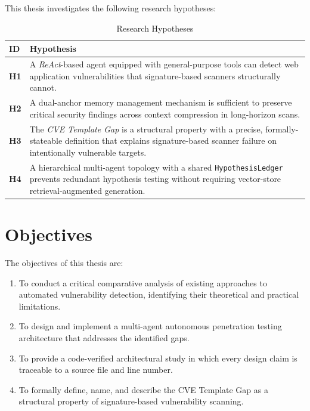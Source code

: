 \documentclass[12pt, a4paper, oneside, openany]{book}
\newcommand{\code}[1]{\texttt{#1}}
\begin{document}
This thesis investigates the following research hypotheses:

\begin{table}[H]
\centering
\caption{Research Hypotheses}
\label{tab:hypotheses}
\begin{tabularx}{\textwidth}{@{}l X@{}}
\toprule
\textbf{ID} & \textbf{Hypothesis} \\
\midrule
\textbf{H1} & A \textit{ReAct}-based agent equipped with general-purpose tools can detect web application vulnerabilities that signature-based scanners structurally cannot. \\
\textbf{H2} & A dual-anchor memory management mechanism is sufficient to preserve critical security findings across context compression in long-horizon scans. \\
\textbf{H3} & The \textit{CVE Template Gap} is a structural property with a precise, formally-stateable definition that explains signature-based scanner failure on intentionally vulnerable targets. \\
\textbf{H4} & A hierarchical multi-agent topology with a shared \code{HypothesisLedger} prevents redundant hypothesis testing without requiring vector-store retrieval-augmented generation. \\
\bottomrule
\end{tabularx}
\end{table}

\section*{Objectives}

The objectives of this thesis are:
\begin{enumerate}[leftmargin=*]
  \item To conduct a critical comparative analysis of existing approaches to automated vulnerability detection, identifying their theoretical and practical limitations.
  \item To design and implement a multi-agent autonomous penetration testing architecture that addresses the identified gaps.
  \item To provide a code-verified architectural study in which every design claim is traceable to a source file and line number.
  \item To formally define, name, and describe the CVE Template Gap as a structural property of signature-based vulnerability scanning.
\end{enumerate}
\end{document}
